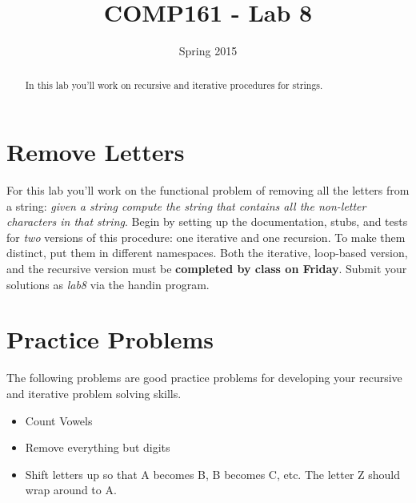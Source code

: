 \documentclass[]{tufte-handout}
\title{COMP161 - Lab 8}
\author{}
\date{Spring 2015}
\begin{document}
\maketitle

\begin{abstract}
In this lab you'll work on recursive and iterative procedures for strings.
\end{abstract}

\section{Remove Letters}

For this lab you'll work on the functional problem of removing all the letters from a string: \textit{given a string compute the string that contains all the non-letter characters in that string}. Begin by setting up the documentation, stubs, and tests for \textit{two} versions of this procedure: one iterative and one recursion. To make them distinct, put them in different namespaces.  Both the iterative, loop-based version, and the recursive version must be \textbf{completed by class on Friday}. Submit your solutions as \textit{lab8} via the handin program.

\section{Practice Problems}

The following problems are good practice problems for developing your recursive and iterative problem solving skills. 
\begin{itemize}
\item Count Vowels
\item Remove everything but digits
\item Shift letters up so that A becomes B, B becomes C, etc.  The letter Z should wrap around to A. 
\end{itemize}
\end{document}
